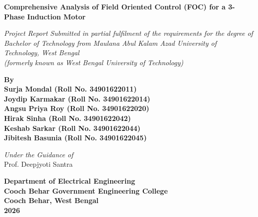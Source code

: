 \documentclass[12pt,a4paper]{report}
\begin{document}
\begin{titlepage}
    \begin{center}
        \vspace*{1cm}
        
        \Huge
        \textbf{Comprehensive Analysis of Field Oriented Control (FOC) for a 3-Phase Induction Motor}
        
        \vspace{1.5cm}
        
        \Large
        \textit{Project Report Submitted in partial fulfilment of the requirements for the degree of\\
        Bachelor of Technology from Maulana Abul Kalam Azad University of Technology, West Bengal\\
        (formerly known as West Bengal University of Technology)}
        
        \vspace{1.5cm}
        
        \textbf{By}\\
        \vspace{0.5cm}
        \textbf{Surja Mondal (Roll No. 34901622011)}\\
        \textbf{Joydip Karmakar (Roll No. 34901622014)}\\
        \textbf{Angsu Priya Roy (Roll No. 34901622020)}\\
        \textbf{Hirak Sinha (Roll No. 34901622042)}\\
        \textbf{Keshab Sarkar (Roll No. 34901622044)}\\
        \textbf{Jibitesh Basunia (Roll No. 34901622045)}
        
        \vspace{1.5cm}
        
        \textit{Under the Guidance of}\\
        \vspace{0.5cm}
        Prof. Deepjyoti Santra
        
        \vfill
        
        \Large
        \textbf{Department of Electrical Engineering}\\
        \textbf{Cooch Behar Government Engineering College}\\
        \textbf{Cooch Behar, West Bengal}\\
        \vspace{0.5cm}
        \textbf{2026}
        
    \end{center}
\end{titlepage}
\end{document}
